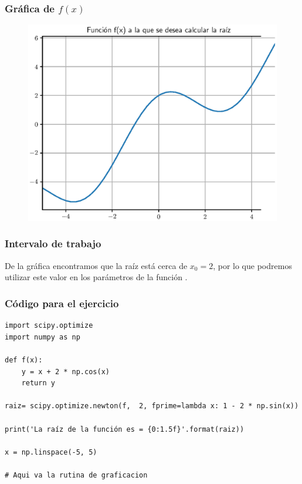 \documentclass[12pt]{beamer}
\begin{document}
\begin{frame}
\frametitle{Gráfica de $f(x)$}
\begin{figure}
    \centering
    \includegraphics[scale=0.55]{Imagenes/raices_scipy_newton_01.eps}
\end{figure}
\end{frame}
\begin{frame}
\frametitle{Intervalo de trabajo}
De la gráfica encontramos que la raíz está cerca de $x_{0} = 2$, por lo que podremos utilizar este valor en los parámetros de la función .
\end{frame}
\begin{frame}
\frametitle{Código para el ejercicio}
\begin{lstlisting}[caption=Código para resolver con optimize.newton]
import scipy.optimize
import numpy as np

def f(x):
    y = x + 2 * np.cos(x)
    return y

raiz= scipy.optimize.newton(f,  2, fprime=lambda x: 1 - 2 * np.sin(x))

print('La raíz de la función es = {0:1.5f}'.format(raiz))

x = np.linspace(-5, 5)

# Aqui va la rutina de graficacion
\end{lstlisting}
\end{frame}
\end{document}
